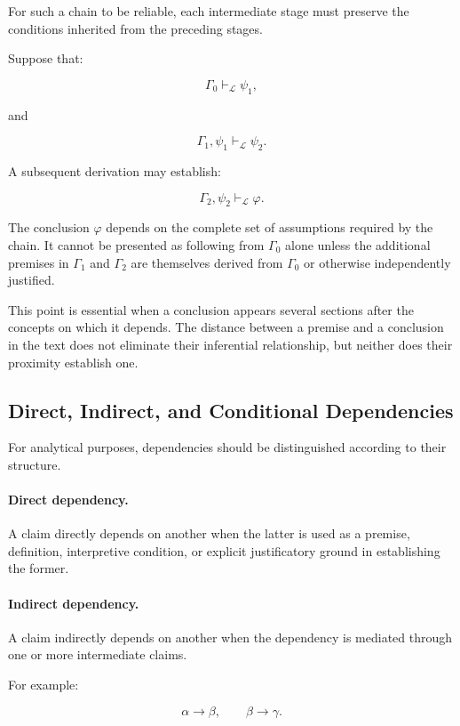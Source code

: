 For such a chain to be reliable, each intermediate stage must
preserve the conditions inherited from the preceding stages.

Suppose that:

\[
    \Gamma_0 \vdash_{\mathcal{L}} \psi_1,
\]

and

\[
    \Gamma_1, \psi_1
    \vdash_{\mathcal{L}} \psi_2.
\]

A subsequent derivation may establish:

\[
    \Gamma_2, \psi_2
    \vdash_{\mathcal{L}} \varphi.
\]

The conclusion \(\varphi\) depends on the complete set of
assumptions required by the chain. It cannot be presented
as following from \(\Gamma_0\) alone unless the additional
premises in \(\Gamma_1\) and \(\Gamma_2\) are themselves
derived from \(\Gamma_0\) or otherwise independently justified.

This point is essential when a conclusion appears several
sections after the concepts on which it depends. The distance
between a premise and a conclusion in the text does not
eliminate their inferential relationship, but neither does
their proximity establish one.

\subsection{Direct, Indirect, and Conditional Dependencies}

For analytical purposes, dependencies should be distinguished
according to their structure.

\paragraph{Direct dependency.}

A claim directly depends on another when the latter is used
as a premise, definition, interpretive condition, or explicit
justificatory ground in establishing the former.

\paragraph{Indirect dependency.}

A claim indirectly depends on another when the dependency
is mediated through one or more intermediate claims.

For example:

\[
    \alpha \rightarrow \beta,
    \qquad
    \beta \rightarrow \gamma.
\]

